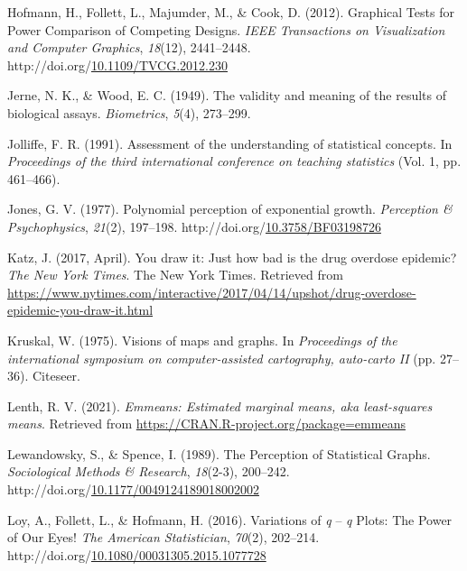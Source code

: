 \documentclass[print]{nuthesis}
\newlength{\cslhangindent}
\newenvironment{CSLReferences}%
{\setlength{\parindent}{0pt}%
\everypar{\setlength{\hangindent}{\cslhangindent}}\ignorespaces}%
{\par}
\begin{document}
\begin{CSLReferences}{1}{0}
\leavevmode{}%
Hofmann, H., Follett, L., Majumder, M., \& Cook, D. (2012). Graphical {Tests} for {Power} {Comparison} of {Competing} {Designs}. \emph{IEEE Transactions on Visualization and Computer Graphics}, \emph{18}(12), 2441--2448. http://doi.org/\href{https://doi.org/10.1109/TVCG.2012.230}{10.1109/TVCG.2012.230}

\leavevmode{}%
Jerne, N. K., \& Wood, E. C. (1949). The validity and meaning of the results of biological assays. \emph{Biometrics}, \emph{5}(4), 273--299.

\leavevmode{}%
Jolliffe, F. R. (1991). Assessment of the understanding of statistical concepts. In \emph{Proceedings of the third international conference on teaching statistics} (Vol. 1, pp. 461--466).

\leavevmode{}%
Jones, G. V. (1977). Polynomial perception of exponential growth. \emph{Perception \& Psychophysics}, \emph{21}(2), 197--198. http://doi.org/\href{https://doi.org/10.3758/BF03198726}{10.3758/BF03198726}

\leavevmode{}%
Katz, J. (2017, April). You draw it: Just how bad is the drug overdose epidemic? \emph{The New York Times}. The New York Times. Retrieved from \url{https://www.nytimes.com/interactive/2017/04/14/upshot/drug-overdose-epidemic-you-draw-it.html}

\leavevmode{}%
Kruskal, W. (1975). Visions of maps and graphs. In \emph{Proceedings of the international symposium on computer-assisted cartography, auto-carto II} (pp. 27--36). Citeseer.

\leavevmode{}%
Lenth, R. V. (2021). \emph{Emmeans: Estimated marginal means, aka least-squares means}. Retrieved from \url{https://CRAN.R-project.org/package=emmeans}

\leavevmode{}%
Lewandowsky, S., \& Spence, I. (1989). The {Perception} of {Statistical} {Graphs}. \emph{Sociological Methods \& Research}, \emph{18}(2-3), 200--242. http://doi.org/\href{https://doi.org/10.1177/0049124189018002002}{10.1177/0049124189018002002}

\leavevmode{}%
Loy, A., Follett, L., \& Hofmann, H. (2016). Variations of \emph{q} -- \emph{q} {Plots}: {The} {Power} of {Our} {Eyes}! \emph{The American Statistician}, \emph{70}(2), 202--214. http://doi.org/\href{https://doi.org/10.1080/00031305.2015.1077728}{10.1080/00031305.2015.1077728}


\end{CSLReferences}
\end{document}
